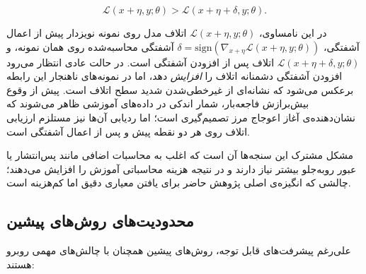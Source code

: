 \documentclass[11pt]{article}
\begin{document}
\begin{equation}
\mathcal{L}(x+\eta, y; \theta) > \mathcal{L}(x+\eta+\delta, y; \theta).
\end{equation}

در این نامساوی، $\mathcal{L}(x+\eta, y; \theta)$ اتلاف مدل روی نمونه‌ نویزدار پیش از اعمال آشفتگی،
$\delta = \mathrm{sign}(\nabla_{x+\eta} \mathcal{L}(x+\eta, y; \theta))$ آشفتگی  محاسبه‌شده روی همان نمونه،
و $\mathcal{L}(x+\eta+\delta, y; \theta)$ اتلاف پس از افزودن آشفتگی است.
در حالت عادی انتظار می‌رود افزودن آشفتگی دشمنانه اتلاف را \textit{افزایش} دهد،
اما در نمونه‌های ناهنجار این رابطه برعکس می‌شود که نشانه‌ای از غیرخطی‌شدن شدید سطح اتلاف است.
پیش از وقوع بیش‌برازش فاجعه‌بار، شمار اندکی  در داده‌های آموزشی ظاهر می‌شوند
که نشان‌دهنده‌ی آغاز اعوجاج مرز تصمیم‌گیری است؛
اما ردیابی آن‌ها نیز مستلزم ارزیابی اتلاف روی هر دو نقطه‌ پیش و پس از اعمال آشفتگی است.

مشکل مشترک این سنجه‌ها آن است که اغلب به محاسبات اضافی مانند پس‌انتشار یا عبور رو‌به‌جلو بیشتر نیاز دارند
و در نتیجه هزینه‌ محاسباتی آموزش را افزایش می‌دهند؛
چالشی که انگیزه‌ی اصلی پژوهش حاضر برای یافتن معیاری دقیق اما کم‌هزینه است.

\subsection{محدودیت‌های روش‌های پیشین}

علی‌رغم پیشرفت‌های قابل توجه، روش‌های پیشین همچنان با چالش‌های مهمی روبرو هستند:
\end{document}
